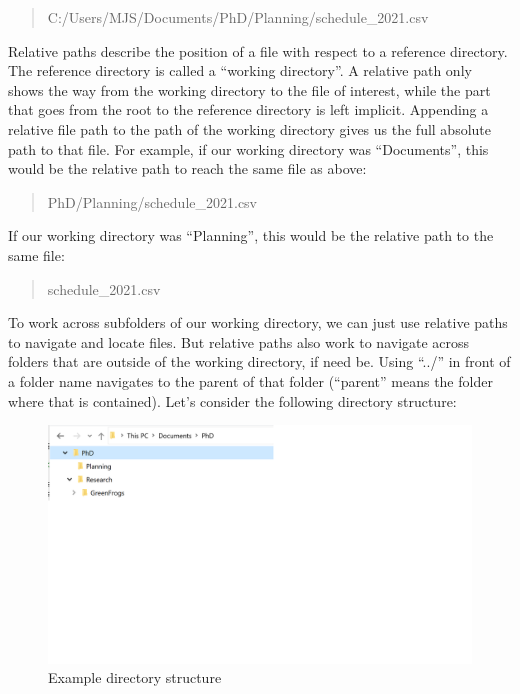 \documentclass[
]{book}
\begin{document}
\begin{quote}
C:/Users/MJS/Documents/PhD/Planning/schedule\_2021.csv
\end{quote}

Relative paths describe the position of a file with respect to a reference directory. The reference directory is called a ``working directory''. A relative path only shows the way from the working directory to the file of interest, while the part that goes from the root to the reference directory is left implicit. Appending a relative file path to the path of the working directory gives us the full absolute path to that file. For example, if our working directory was ``Documents'', this would be the relative path to reach the same file as above:

\begin{quote}
PhD/Planning/schedule\_2021.csv
\end{quote}

If our working directory was ``Planning'', this would be the relative path to the same file:

\begin{quote}
schedule\_2021.csv
\end{quote}

To work across subfolders of our working directory, we can just use relative paths to navigate and locate files. But relative paths also work to navigate across folders that are outside of the working directory, if need be. Using ``../'' in front of a folder name navigates to the parent of that folder (``parent'' means the folder where that is contained). Let's consider the following directory structure:

\begin{figure}

{\centering \includegraphics[width=32in]{img/directory-tree} 

}

\caption{Example directory structure}\label{fig:dir-example}
\end{figure}
\end{document}
